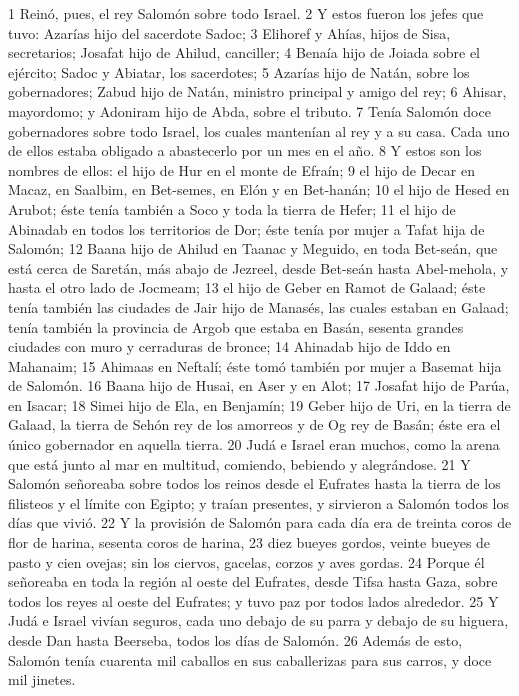 1 Reinó, pues, el rey Salomón sobre todo Israel.
2 Y estos fueron los jefes que tuvo: Azarías hijo del sacerdote Sadoc;
3 Elihoref y Ahías, hijos de Sisa, secretarios; Josafat hijo de Ahilud, canciller;
4 Benaía hijo de Joiada sobre el ejército; Sadoc y Abiatar, los sacerdotes;
5 Azarías hijo de Natán, sobre los gobernadores; Zabud hijo de Natán, ministro principal y amigo del rey;
6 Ahisar, mayordomo; y Adoniram hijo de Abda, sobre el tributo.
7 Tenía Salomón doce gobernadores sobre todo Israel, los cuales mantenían al rey y a su casa. Cada uno de ellos estaba obligado a abastecerlo por un mes en el año. 
8 Y estos son los nombres de ellos: el hijo de Hur en el monte de Efraín;
9 el hijo de Decar en Macaz, en Saalbim, en Bet-semes, en Elón y en Bet-hanán;
10 el hijo de Hesed en Arubot; éste tenía también a Soco y toda la tierra de Hefer;
11 el hijo de Abinadab en todos los territorios de Dor; éste tenía por mujer a Tafat hija de Salomón;
12 Baana hijo de Ahilud en Taanac y Meguido, en toda Bet-seán, que está cerca de Saretán, más abajo de Jezreel, desde Bet-seán hasta Abel-mehola, y hasta el otro lado de Jocmeam;
13 el hijo de Geber en Ramot de Galaad; éste tenía también las ciudades de Jair hijo de Manasés, las cuales estaban en Galaad; tenía también la provincia de Argob que estaba en Basán, sesenta grandes ciudades con muro y cerraduras de bronce;
14 Ahinadab hijo de Iddo en Mahanaim;
15 Ahimaas en Neftalí; éste tomó también por mujer a Basemat hija de Salomón.
16 Baana hijo de Husai, en Aser y en Alot;
17 Josafat hijo de Parúa, en Isacar;
18 Simei hijo de Ela, en Benjamín;
19 Geber hijo de Uri, en la tierra de Galaad, la tierra de Sehón rey de los amorreos y de Og rey de Basán; éste era el único gobernador en aquella tierra.
20 Judá e Israel eran muchos, como la arena que está junto al mar en multitud, comiendo, bebiendo y alegrándose.
21 Y Salomón señoreaba sobre todos los reinos desde el Eufrates hasta la tierra de los filisteos y el límite con Egipto; y traían presentes, y sirvieron a Salomón todos los días que vivió.
22 Y la provisión de Salomón para cada día era de treinta coros   de flor de harina, sesenta coros de harina,
23 diez bueyes gordos, veinte bueyes de pasto y cien ovejas; sin los ciervos, gacelas, corzos y aves gordas.
24 Porque él señoreaba en toda la región al oeste del Eufrates, desde Tifsa hasta Gaza, sobre todos los reyes al oeste del Eufrates; y tuvo paz por todos lados alrededor.
25 Y Judá e Israel vivían seguros, cada uno debajo de su parra y debajo de su higuera, desde Dan hasta Beerseba, todos los días de Salomón.
26 Además de esto, Salomón tenía cuarenta mil caballos en sus caballerizas para sus carros, y doce mil jinetes. 
